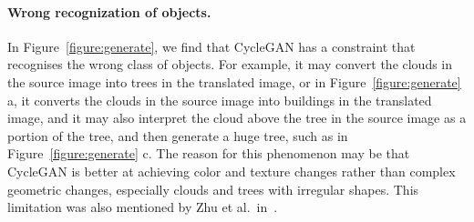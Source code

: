 \paragraph{Wrong recognization of objects.} In Figure~\ref{figure:generate}, we find that CycleGAN has a constraint that recognises the wrong class of objects. For example, it may convert the clouds in the source image into trees in the translated image, or in Figure~\ref{figure:generate} a, it converts the clouds in the source image into buildings in the translated image, and it may also interpret the cloud above the tree in the source image as a portion of the tree, and then generate a huge tree, such as in  Figure~\ref{figure:generate} c. The reason for this phenomenon may be that CycleGAN is better at achieving color and texture changes rather than complex geometric changes, especially clouds and trees with irregular shapes. This limitation was also mentioned by Zhu et al.\ in~\cite{zhu2017unpaired}.

